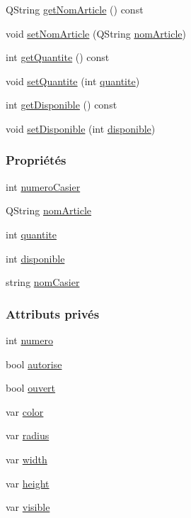 \begin{DoxyCompactItemize}
\item 
Q\+String \hyperlink{class_casier_ad1e4ebd48218bc19d8e29e98b6a9e939}{get\+Nom\+Article} () const
\item 
void \hyperlink{class_casier_ab46ac6ac9c4fae70f9b8ef23f856fa52}{set\+Nom\+Article} (Q\+String \hyperlink{class_casier_a9632bfa0e94a522bab9da1c3834eaf5a}{nom\+Article})
\item 
int \hyperlink{class_casier_ad4b3ee57fdc7240b2a895b7f70f4cd11}{get\+Quantite} () const
\item 
void \hyperlink{class_casier_a41aee5f476516dc87b66674c6b9c6d4b}{set\+Quantite} (int \hyperlink{class_casier_acf950b0ab2ee437a9dbc8c6b66432b4c}{quantite})
\item 
int \hyperlink{class_casier_a7d25b1a4bdbe4e600734cda8fb944258}{get\+Disponible} () const
\item 
void \hyperlink{class_casier_ac41e3c5e88e638c1375b35940c1870ed}{set\+Disponible} (int \hyperlink{class_casier_a5bf1314910ade36747faffdd891d94e9}{disponible})
\end{DoxyCompactItemize}
\subsubsection*{Propriétés}
\begin{DoxyCompactItemize}
\item 
int \hyperlink{class_casier_abc4e6c9bde55c9b703ea53d85b6b1219}{numero\+Casier}
\item 
Q\+String \hyperlink{class_casier_a9632bfa0e94a522bab9da1c3834eaf5a}{nom\+Article}
\item 
int \hyperlink{class_casier_acf950b0ab2ee437a9dbc8c6b66432b4c}{quantite}
\item 
int \hyperlink{class_casier_a5bf1314910ade36747faffdd891d94e9}{disponible}
\item 
string \hyperlink{class_casier_ac4b85818b807b9f775123b202945c8ab}{nom\+Casier}
\end{DoxyCompactItemize}
\subsubsection*{Attributs privés}
\begin{DoxyCompactItemize}
\item 
int \hyperlink{class_casier_a17aa23e73b177559266a9fb17f63b812}{numero}
\item 
bool \hyperlink{class_casier_a2dd9fbe4a93685080a9b5c8f69e3f29a}{autorise}
\item 
bool \hyperlink{class_casier_afe544ed1a87ce714a9fbbe16126669e4}{ouvert}
\item 
var \hyperlink{class_casier_a487466f23493744123ce4a17dfe98916}{color}
\item 
var \hyperlink{class_casier_a5632690d442ab8599f15bb38cefd88f7}{radius}
\item 
var \hyperlink{class_casier_ad3669533289f2312284be7fce28141f3}{width}
\item 
var \hyperlink{class_casier_aac5102ef3b0edc40ebcffb9ef3805d63}{height}
\item 
var \hyperlink{class_casier_af0235cfd5b758941075fe3c9ce33f9a6}{visible}
\end{DoxyCompactItemize}


